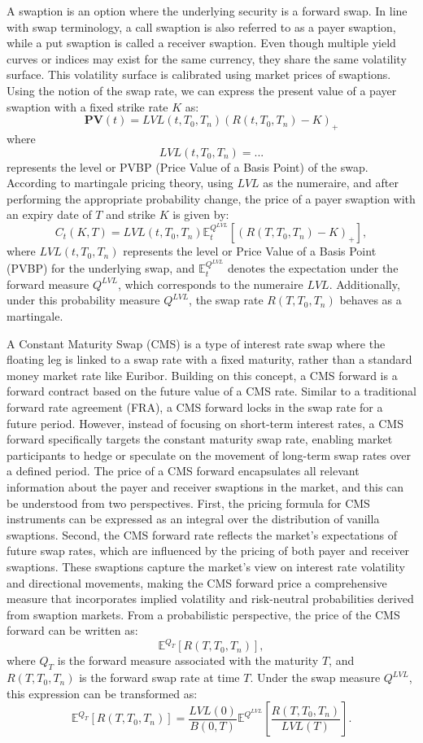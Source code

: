 A swaption is an option where the underlying security is a forward swap. In line with swap terminology, 
a call swaption is also referred to as a payer swaption, while a put swaption is called a receiver swaption. 
Even though multiple yield curves or indices may exist for the same currency, they share the same volatility surface. 
This volatility surface is calibrated using market prices of swaptions. Using the notion of the swap rate, we can express the present value of 
a payer swaption with a fixed strike rate \(K\) as:
$$
\mathbf{PV}(t) = LVL(t, T_{0}, T_{n})(R(t, T_{0}, T_{n}) - K)_{+}
$$
where
$$
LVL(t, T_{0}, T_{n}) = ...
$$
represents the level or PVBP (Price Value of a Basis Point) of the swap. 
According to martingale pricing theory, using \(LVL\) as the numeraire, and after performing the appropriate probability change, 
the price of a payer swaption with an expiry date of \(T\) and strike \(K\) is given by:
$$
C_{t}(K,T) = LVL(t, T_0, T_n)\mathbb{E}^{Q^{LVL}}_{t}[(R(T, T_0, T_n)-K)_{+}],
$$
where \(LVL(t, T_0, T_n)\) represents the level or Price Value of a Basis Point (PVBP) for the underlying swap, and \(\mathbb{E}^{Q^{LVL}}_{t}\) 
denotes the expectation under the forward measure \(Q^{LVL}\), which corresponds to the numeraire \(LVL\).
Additionally, under this probability measure \(Q^{LVL}\), the swap rate \(R(T, T_0, T_n)\) behaves as a martingale. 

A Constant Maturity Swap (CMS) is a type of interest rate swap where the floating leg is linked to a swap rate with a fixed maturity, 
rather than a standard money market rate like Euribor. Building on this concept, a CMS forward is a forward contract based on the future 
value of a CMS rate. Similar to a traditional forward rate agreement (FRA), a CMS forward locks in the swap rate for a future period. 
However, instead of focusing on short-term interest rates, a CMS forward specifically targets the constant maturity swap rate, 
enabling market participants to hedge or speculate on the movement of long-term swap rates over a defined period.
The price of a CMS forward encapsulates all relevant information about the payer and receiver swaptions in the market, 
and this can be understood from two perspectives. First, the pricing formula for CMS instruments can be expressed as an integral over 
the distribution of vanilla swaptions. Second, the CMS forward rate reflects the market's expectations of future swap rates, 
which are influenced by the pricing of both payer and receiver swaptions. These swaptions capture the market's view on interest rate 
volatility and directional movements, making the CMS forward price a comprehensive measure that incorporates implied volatility and 
risk-neutral probabilities derived from swaption markets. 
From a probabilistic perspective, the price of the CMS forward can be written as:
$$
\mathbb{E}^{Q_{T}}[R(T, T_0, T_n)],
$$
where \( Q_T \) is the forward measure associated with the maturity \( T \), and \( R(T, T_0, T_n) \) is the forward swap rate at time \( T \). 
Under the swap measure \( Q^{LVL} \), this expression can be transformed as:
$$
\mathbb{E}^{Q_{T}}[R(T, T_0, T_n)] = \frac{LVL(0)}{B(0, T)} \mathbb{E}^{Q^{LVL}} \left[\frac{R(T, T_0, T_n)}{LVL(T)}\right].
$$





